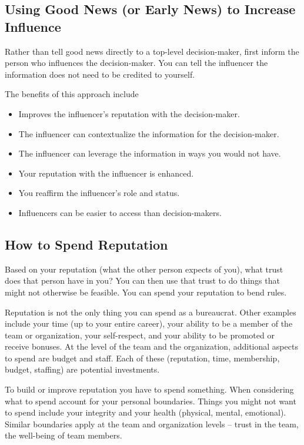 \subsection*{Using Good News (or Early News) to Increase Influence}

Rather than tell good news directly to a top-level decision-maker, first inform the person who influences the decision-maker.
You can tell the influencer the information does not need to be credited to yourself.

The benefits of this approach include
\begin{itemize}
    \item Improves the influencer's reputation with the decision-maker.
    \item The influencer can contextualize the information for the decision-maker.
    \item The influencer can leverage the information in ways you would not have.
    \item Your reputation with the influencer is enhanced.
    \item You reaffirm the influencer's role and status.
    \item Influencers can be easier to access than decision-makers.
\end{itemize}

\subsection*{How to Spend Reputation}

Based on your reputation (what the other person expects of you), what trust does that person have in you?  You can then use that trust to do things that might not otherwise be feasible. You can spend your reputation to bend  rules. 

Reputation is not the only thing you can spend as a bureaucrat. Other examples include your time (up to your entire career), your ability to be a member of the team or organization, your self-respect, and your ability to be promoted or receive bonuses. At the level of the team and the organization, additional aspects to spend are  budget and  staff. Each of these (reputation, time, membership, budget, staffing) are potential investments. 

To build or improve reputation you have to spend something.
When considering what to spend account for your personal boundaries. 
Things you might not want to spend include your integrity and your health (physical, mental, emotional). Similar boundaries apply at the team and organization levels -- trust in the team, the well-being of team members. 


